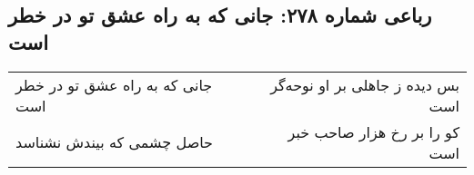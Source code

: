 \begin{center}
\section*{رباعی شماره ۲۷۸: جانی که به راه عشق تو در خطر است}
\label{sec:0278}
\begin{longtable}{l p{0.5cm} r}
جانی که به راه عشق تو در خطر است
&&
بس دیده ز جاهلی بر او نوحه‌گر است
\\
حاصل چشمی که بیندش نشناسد
&&
کو را بر رخ هزار صاحب خبر است
\\
\end{longtable}
\end{center}
